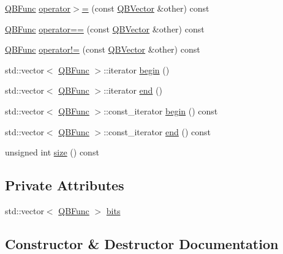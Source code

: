\begin{DoxyCompactItemize}
\item 
\hyperlink{classQuickMath_1_1QBFunc}{Q\+B\+Func} \hyperlink{classQuickMath_1_1QBVector_a553bbd02da9f430a1655a82ea1c230cc}{operator$>$=} (const \hyperlink{classQuickMath_1_1QBVector}{Q\+B\+Vector} \&other) const 
\item 
\hyperlink{classQuickMath_1_1QBFunc}{Q\+B\+Func} \hyperlink{classQuickMath_1_1QBVector_a57945ed39797ce903ca579524b50b2fd}{operator==} (const \hyperlink{classQuickMath_1_1QBVector}{Q\+B\+Vector} \&other) const 
\item 
\hyperlink{classQuickMath_1_1QBFunc}{Q\+B\+Func} \hyperlink{classQuickMath_1_1QBVector_a3b17560e6aa7f715274f9fb507c68007}{operator!=} (const \hyperlink{classQuickMath_1_1QBVector}{Q\+B\+Vector} \&other) const 
\item 
std\+::vector$<$ \hyperlink{classQuickMath_1_1QBFunc}{Q\+B\+Func} $>$\+::iterator \hyperlink{classQuickMath_1_1QBVector_aefa38c71c1d50322ffa9b5d9162b1054}{begin} ()
\item 
std\+::vector$<$ \hyperlink{classQuickMath_1_1QBFunc}{Q\+B\+Func} $>$\+::iterator \hyperlink{classQuickMath_1_1QBVector_ae92252e45c6fd308e28d85f554f5fb94}{end} ()
\item 
std\+::vector$<$ \hyperlink{classQuickMath_1_1QBFunc}{Q\+B\+Func} $>$\+::const\+\_\+iterator \hyperlink{classQuickMath_1_1QBVector_a79199571a7786d1ecb10122ddabbad8f}{begin} () const 
\item 
std\+::vector$<$ \hyperlink{classQuickMath_1_1QBFunc}{Q\+B\+Func} $>$\+::const\+\_\+iterator \hyperlink{classQuickMath_1_1QBVector_a2ca9b0a69061b150c1b6ce463f403481}{end} () const 
\item 
unsigned int \hyperlink{classQuickMath_1_1QBVector_a245af50766475e7d62c51c1e69b55caa}{size} () const 
\end{DoxyCompactItemize}
\subsection*{Private Attributes}
\begin{DoxyCompactItemize}
\item 
std\+::vector$<$ \hyperlink{classQuickMath_1_1QBFunc}{Q\+B\+Func} $>$ \hyperlink{classQuickMath_1_1QBVector_a6e017544e097d563950754952fa42825}{bits}
\end{DoxyCompactItemize}


\subsection{Constructor \& Destructor Documentation}
\hypertarget{classQuickMath_1_1QBVector_acc9096f5b85f712f8b6b135e0602cdc3}{}
